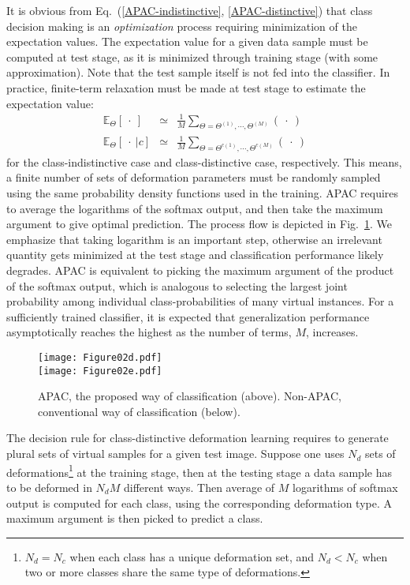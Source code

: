 \documentclass[10pt,twocolumn,letterpaper]{article}
\begin{document}
It is obvious from 
Eq.~(\ref{APAC-indistinctive}, \ref{APAC-distinctive})
that class decision making is an {\it optimization} process
requiring minimization of the expectation values.
The expectation value for a given data sample 
must be computed at test stage,
as it is minimized through training stage (with some approximation).
Note that the test sample itself is not fed into the classifier.
In practice, finite-term relaxation must be made at test stage
to estimate the expectation value:
\begin{eqnarray}
\mathbb{E}_\Theta [~\cdot~] &\simeq & \frac{1}{M}
\sum_{\Theta = \Theta^{(1)}, \cdots, \Theta^{(M)}} (~\cdot~)
\label{eq-finite-term-approximation}
\\
\mathbb{E}_\Theta [~\cdot~ | c] &\simeq & \frac{1}{M}
\sum_{\Theta = \Theta^{c(1)}, \cdots, \Theta^{c(M)}} (~\cdot~)
\end{eqnarray}
for the class-indistinctive case and class-distinctive case, respectively.
This means, a finite number of sets of deformation parameters must be randomly sampled
using the same probability density functions used in the 
training.
APAC requires to average the logarithms of the softmax output,
and then take the maximum argument to give optimal prediction.
The process flow is depicted in Fig.~\ref{fig-APAC}.
We emphasize that taking logarithm is an important step,
otherwise an irrelevant quantity gets minimized at the test stage and
classification performance likely degrades.
APAC is equivalent to picking the maximum argument of the product of the softmax output,
which is analogous to selecting the largest joint probability 
among individual class-probabilities of many virtual instances.
For a sufficiently trained classifier, it is expected that generalization performance asymptotically reaches the highest 
as the number of terms, $M$, increases.
\begin{figure}[t]
\begin{center}
\texttt{[image: Figure02d.pdf]}\\ \vspace{-0.0cm}
\texttt{[image: Figure02e.pdf]}
\end{center}
\caption{APAC, the proposed way of classification (above).
Non-APAC, conventional way of classification (below).}
\label{fig-APAC}
\end{figure}

The decision rule for class-distinctive deformation learning
requires to generate plural sets of virtual samples for a given test image.
Suppose one uses $N_d$ sets of 
deformations\footnote{$N_d=N_c$ when each class has a unique deformation set, and
$N_d<N_c$ when two or more classes share the same type of deformations.}
at the training stage, then
at the testing stage a data sample has to be deformed in $N_d M$ different ways.
Then average of $M$ logarithms of softmax output is computed 
for each class, using the corresponding deformation type.
A maximum argument is then picked to predict a class.
\end{document}
